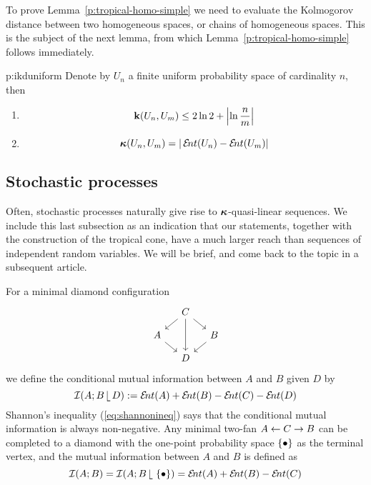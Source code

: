   To prove Lemma~\ref{p:tropical-homo-simple} we need to evaluate the
  Kolmogorov distance between two homogeneous spaces, or chains of
  homogeneous spaces. This is the
  subject of the next lemma, from which
  Lemma~\ref{p:tropical-homo-simple} follows immediately.


\begin{lemma}{p:ikduniform}
  Denote by $U_{n}$ a finite uniform probability space of cardinality
  $n$, then
  \begin{enumerate}
  \item 
    \[
    \operatorname{\mathbf{k}}(U_{n},U_{m})\leq 2 \ln 2 + \left|\ln\frac nm\right|
    \]
  \item
    \[
    \aikd(U_{n},U_{m})=|\ent(U_{n})-\ent(U_{m})|
    \]
  \end{enumerate}
\end{lemma}


\subsection{Stochastic processes}
  Often, stochastic processes naturally give rise to
  $\operatorname{{\bm\kappa}}$-quasi-linear sequences.  We include this last subsection as
  an indication that our statements, together with the construction of
  the tropical cone, have a much larger reach than sequences of
  independent random variables.  We will be brief, and come back to
  the topic in a subsequent article.

  For a minimal diamond configuration
  \[
  \begin{tikzcd}[row sep=small, column sep=small]
    \mbox{}
    & 
    C
    \arrow{dl}{}
    \arrow{dr}{}
    \arrow{dd}{}
    &
    \\
    A
    \arrow{dr}{}
    & 
    &
    B
    \arrow{dl}{}
    \\
    \mbox{}
    &
    D
    &
  \end{tikzcd}
  \]
  we define the conditional mutual information between $A$ and $B$ given $D$ by
  \[
  \MI(A; B \, \rel \, D) := \ent(A) + \ent(B) - \ent(C) - \ent(D)
  \]
  Shannon's inequality (\ref{eq:shannonineq}) says that the
  conditional mutual information is always non-negative.  Any minimal
  two-fan $A \stackrel{}{\leftarrow} C \stackrel{}{\rightarrow} B$ can be completed to a diamond with the
  one-point probability space $\left\{\bullet\right\}$ as the terminal vertex,
  and the mutual information between $A$ and $B$ is defined as
  \[
  \MI(A; B) = \MI(A; B \, \rel \, \set{ \bullet }) = \ent(A) + \ent(B) - \ent(C)
  \]
  
